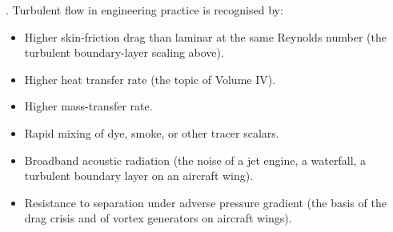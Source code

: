 . Turbulent flow in engineering
practice is recognised by:

\begin{itemize}[leftmargin=*]
  \item Higher skin-friction drag than laminar at the same Reynolds
    number (the turbulent boundary-layer scaling above).
  \item Higher heat transfer rate (the topic of Volume IV).
  \item Higher mass-transfer rate.
  \item Rapid mixing of dye, smoke, or other tracer scalars.
  \item Broadband acoustic radiation (the noise of a jet engine, a
    waterfall, a turbulent boundary layer on an aircraft wing).
  \item Resistance to separation under adverse pressure gradient
    (the basis of the drag crisis and of vortex generators on
    aircraft wings).
\end{itemize}

